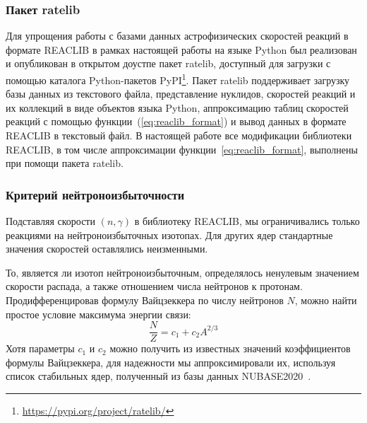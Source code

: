 \subsubsection{Пакет ratelib}
Для упрощения работы с базами данных астрофизических скоростей реакций в формате REACLIB в рамках настоящей работы на языке Python был реализован и опубликован в открытом доустпе пакет ratelib, доступный для загрузки с помощью каталога Python-пакетов PyPI\footnote{\href{https://pypi.org/project/ratelib/}{https://pypi.org/project/ratelib/}}. Пакет ratelib поддерживает загрузку базы данных из текстового файла, представление нуклидов, скоростей реакций и их коллекций в виде объектов языка Python, аппроксимацию таблиц скоростей реакций с помощью функции~(\ref{eq:reaclib_format}) и вывод данных в формате REACLIB в текстовый файл. В настоящей работе все модификации библиотеки REACLIB, в том числе аппроксимации функции~\ref{eq:reaclib_format}, выполнены при помощи пакета ratelib.

\subsubsection{Критерий нейтроноизбыточности}
Подставляя скорости $(n,\gamma)$ в библиотеку REACLIB, мы ограничивались только реакциями на нейтроноизбыточных изотопах. Для других ядер стандартные значения скоростей оставлялись неизменными.

То, является ли изотоп нейтроноизбыточным, определялось ненулевым значением скорости распада, а также отношением числа нейтронов к протонам. Продифференцировав формулу Вайцзеккера по числу нейтронов $N$, можно найти простое условие максимума энергии связи:
\begin{equation}
  \displaystyle
  \frac{N}{Z} = c_1 + c_2 A^{2/3}
  \label{eq:nzratio}
\end{equation}
Хотя параметры $c_1$ и $c_2$ можно получить из известных значений коэффициентов формулы Вайцзеккера, для надежности мы аппроксимировали их, используя список стабильных ядер, полученный из базы данных NUBASE2020~\cite{kondev2021}.

